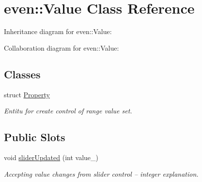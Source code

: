 \hypertarget{classeven_1_1_value}{}\section{even\+:\+:Value Class Reference}
\label{classeven_1_1_value}


Inheritance diagram for even\+:\+:Value\+:


Collaboration diagram for even\+:\+:Value\+:
\subsection*{Classes}
\begin{DoxyCompactItemize}
\item 
struct \mbox{\hyperlink{structeven_1_1_value_1_1_property}{Property}}
\begin{DoxyCompactList}\small\item\em Entitu for create control of range value set. \end{DoxyCompactList}\end{DoxyCompactItemize}
\subsection*{Public Slots}
\begin{DoxyCompactItemize}
\item 
\mbox{\label{classeven_1_1_value_a7504a38838dd896c94238a1be25ae3e6}} 
void \mbox{\hyperlink{classeven_1_1_value_a7504a38838dd896c94238a1be25ae3e6}{slider\+Updated}} (int value\+\_\+)
\begin{DoxyCompactList}\small\item\em Accepting value changes from slider control -- integer explanation. \end{DoxyCompactList}\end{DoxyCompactItemize}
